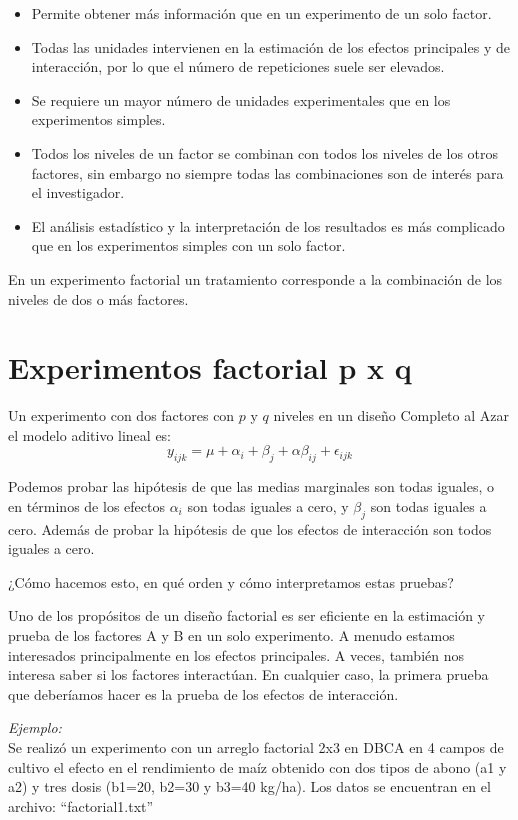\documentclass[]{book}
\providecommand{\tightlist}{%
  \setlength{\itemsep}{0pt}\setlength{\parskip}{0pt}}
\begin{document}
\begin{itemize}
\tightlist
\item
  Permite obtener más información que en un experimento de un solo
  factor.
\item
  Todas las unidades intervienen en la estimación de los efectos
  principales y de interacción, por lo que el número de repeticiones
  suele ser elevados.
\item
  Se requiere un mayor número de unidades experimentales que en los
  experimentos simples.
\item
  Todos los niveles de un factor se combinan con todos los niveles de
  los otros factores, sin embargo no siempre todas las combinaciones son
  de interés para el investigador.
\item
  El análisis estadístico y la interpretación de los resultados es más
  complicado que en los experimentos simples con un solo factor.
\end{itemize}

En un experimento factorial un tratamiento corresponde a la combinación
de los niveles de dos o más factores.

\section{Experimentos factorial p x
q}\label{experimentos-factorial-p-x-q}

Un experimento con dos factores con \(p\) y \(q\) niveles en un diseño
Completo al Azar el modelo aditivo lineal es:
\[y_{ijk}=\mu + \alpha_i+\beta_j+\alpha\beta_{ij}+\epsilon_{ijk}\]

Podemos probar las hipótesis de que las medias marginales son todas
iguales, o en términos de los efectos \(\alpha_i\) son todas iguales a
cero, y \(\beta_j\) son todas iguales a cero. Además de probar la
hipótesis de que los efectos de interacción son todos iguales a cero.

¿Cómo hacemos esto, en qué orden y cómo interpretamos estas pruebas?

Uno de los propósitos de un diseño factorial es ser eficiente en la
estimación y prueba de los factores A y B en un solo experimento. A
menudo estamos interesados principalmente en los efectos principales. A
veces, también nos interesa saber si los factores interactúan. En
cualquier caso, la primera prueba que deberíamos hacer es la prueba de
los efectos de interacción.

\emph{Ejemplo:}\\
Se realizó un experimento con un arreglo factorial 2x3 en DBCA en 4
campos de cultivo el efecto en el rendimiento de maíz obtenido con dos
tipos de abono (a1 y a2) y tres dosis (b1=20, b2=30 y b3=40 kg/ha). Los
datos se encuentran en el archivo: ``factorial1.txt''
\end{document}
